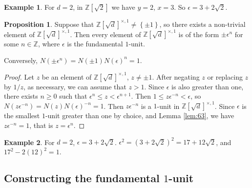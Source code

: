 \documentclass{article}
\newcommand{\Z}{\mathbb{Z}}
\newcommand{\rb}[1]{\left( #1 \right)}
\renewcommand{\sb}[1]{\left[ #1 \right]}
\newcommand{\cb}[1]{\left\{ #1 \right\}}
\theoremstyle{definition}\newtheorem{definition}{Definition}
\theoremstyle{definition}\newtheorem{remark}[definition]{Remark}
\theoremstyle{definition}\newtheorem*{example}{Example}
\theoremstyle{definition}\newtheorem*{note}{Note}
\newtheorem{proposition}[definition]{Proposition}
\begin{document}
\begin{example}
For $ d = 2 $, in $ \Z\sb{\sqrt{2}} $ we have $ y = 2 $, $ x = 3 $. So $ \epsilon = 3 + 2\sqrt{2} $.
\end{example}

\begin{proposition}
Suppose that $ \Z\sb{\sqrt{d}}^{\times, 1} \ne \cb{\pm 1} $, so there exists a non-trivial element of $ \Z\sb{\sqrt{d}}^{\times, 1} $. Then every element of $ \Z\sb{\sqrt{d}}^{\times, 1} $ is of the form $ \pm \epsilon^n $ for some $ n \in \Z $, where $ \epsilon $ is the fundamental $ 1 $-unit.
\end{proposition}

Conversely, $ N\rb{\pm \epsilon^n} = N\rb{\pm 1}N\rb{\epsilon}^n = 1 $.

\begin{proof}
Let $ z $ be an element of $ \Z\sb{\sqrt{d}}^{\times, 1} $, $ z \ne \pm 1 $. After negating $ z $ or replacing $ z $ by $ 1 / z $, as necessary, we can assume that $ z > 1 $. Since $ \epsilon $ is also greater than one, there exists $ n \ge 0 $ such that $ \epsilon^n \le z < \epsilon^{n + 1} $. Then $ 1 \le z\epsilon^{-n} < \epsilon $, so $ N\rb{z\epsilon^{-n}} = N\rb{z}N\rb{\epsilon}^{-n} = 1 $. Then $ z\epsilon^{-n} $ is a $ 1 $-unit in $ \Z\sb{\sqrt{d}}^{\times, 1} $. Since $ \epsilon $ is the smallest $ 1 $-unit greater than one by choice, and Lemma \ref{lem:63}, we have $ z\epsilon^{-n} = 1 $, that is $ z = \epsilon^n $.
\end{proof}

\begin{example}
For $ d = 2 $, $ \epsilon = 3 + 2\sqrt{2} $. $ \epsilon^2 = \rb{3 + 2\sqrt{2}}^2 = 17 + 12\sqrt{2} $, and $ 17^2 - 2\rb{12}^2  = 1 $.
\end{example}

\subsection{Constructing the fundamental $ 1 $-unit}
\end{document}
